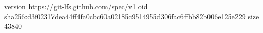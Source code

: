 version https://git-lfs.github.com/spec/v1
oid sha256:d3f02317dea44ff4fa0cbc60a02185c9514955d306fac6ffbb82b006e125e229
size 43840
